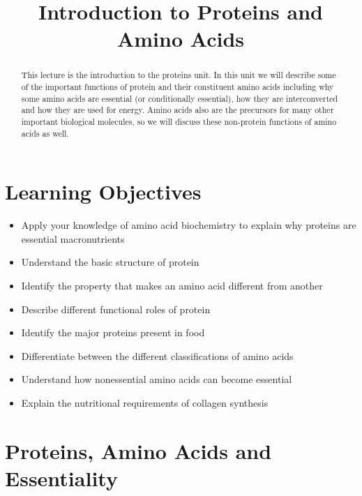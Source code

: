 \documentclass{tufte-handout}
\title{Introduction to Proteins and Amino Acids}
\author{}
\date{}  %
\begin{document}
\maketitle%

\begin{abstract}
\noindent This lecture is the introduction to the proteins unit.  In this unit we will describe some of the important functions of protein and their constituent amino acids including why some amino acids are essential (or conditionally essential), how they are interconverted and how they are used for energy.  Amino acids also are the precursors for many other important biological molecules, so we will discuss these non-protein functions of amino acids as well.
\end{abstract}

\tableofcontents

\pagebreak
\section{Learning Objectives}

\begin{itemize}
\item Apply your knowledge of amino acid biochemistry to explain why proteins are essential macronutrients
\item Understand the basic structure of protein
\item Identify the property that makes an amino acid different from another 
\item Describe different functional roles of protein
\item Identify the major proteins present in food
\item Differentiate between the different classifications of amino acids
\item Understand how nonessential amino acids can become essential
\item Explain the nutritional requirements of collagen synthesis


\end{itemize}

\section{Proteins, Amino Acids and Essentiality}
\end{document}
